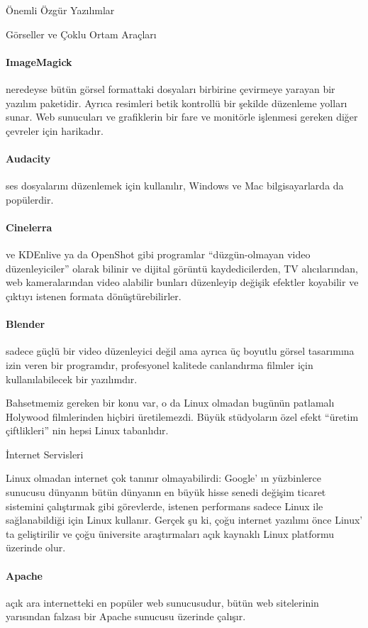 \begin{section}{Önemli Özgür Yazılımlar}
\begin{subsection}{Görseller ve Çoklu Ortam Araçları}
\paragraph{ImageMagick}{neredeyse bütün görsel formattaki dosyaları birbirine çevirmeye yarayan bir yazılım paketidir. Ayrıca resimleri betik kontrollü bir şekilde düzenleme yolları sunar. Web sunucuları ve grafiklerin bir fare ve monitörle işlenmesi gereken diğer çevreler için harikadır.}
\paragraph{Audacity}{ses dosyalarını düzenlemek için kullanılır, Windows ve Mac bilgisayarlarda da popülerdir.}
\paragraph{Cinelerra}{ve KDEnlive ya da OpenShot gibi programlar “düzgün-olmayan video düzenleyiciler” olarak bilinir ve dijital görüntü kaydedicilerden, TV alıcılarından, web kameralarından video alabilir bunları düzenleyip değişik efektler koyabilir ve çıktıyı istenen formata dönüştürebilirler.}
\paragraph{Blender}{sadece güçlü bir video düzenleyici değil ama ayrıca üç boyutlu görsel tasarımına izin veren bir programdır, profesyonel kalitede canlandırma filmler için kullanılabilecek bir yazılımdır.}

Bahsetmemiz gereken bir konu var, o da Linux olmadan bugünün patlamalı Holywood filmlerinden hiçbiri üretilemezdi. Büyük stüdyoların özel efekt “üretim çiftlikleri” nin hepsi Linux tabanlıdır.
\end{subsection}
\begin{subsection}{İnternet Servisleri}

Linux olmadan internet çok tanınır olmayabilirdi: Google' ın yüzbinlerce sunucusu dünyanın bütün dünyanın en büyük hisse senedi değişim ticaret sistemini çalıştırmak gibi görevlerde, istenen performans sadece Linux ile sağlanabildiği için Linux kullanır. Gerçek şu ki, çoğu internet yazılımı önce Linux' ta geliştirilir ve çoğu üniversite araştırmaları açık kaynaklı Linux platformu üzerinde olur.

\paragraph{Apache}{açık ara internetteki en popüler web sunucusudur, bütün web sitelerinin yarısından falzası bir Apache sunucusu üzerinde çalışır.}

\end{subsection}
\end{section}
